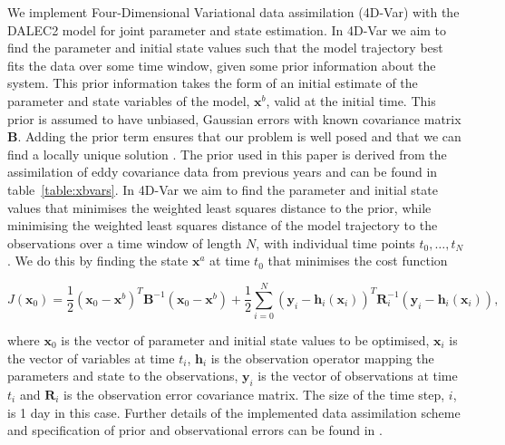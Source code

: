 \documentclass[draft,linenumbers]{agujournal}
\begin{document}
We implement Four-Dimensional Variational data assimilation (4D-Var) with the DALEC2 model for joint parameter and state estimation. In 4D-Var we aim to find the parameter and initial state values such that the model trajectory best fits the data over some time window, given some prior information about the system. This prior information takes the form of an initial estimate of the parameter and state variables of the model, $\textbf{x}^{b}$, valid at the initial time. This prior is assumed to have unbiased, Gaussian errors with known covariance matrix $\textbf{B}$. Adding the prior term ensures that our problem is well posed and that we can find a locally unique solution \citep{Tremolet2006}. The prior used in this paper is derived from the assimilation of eddy covariance data from previous years and can be found in table~\ref{table:xbvars}. In 4D-Var we aim to find the parameter and initial state values that minimises the weighted least squares distance to the prior, while minimising the weighted least squares distance of the model trajectory to the observations over a time window of length \(N\), with individual time points $t_{0}, \dots, t_{N}$ \citep{lawless2013}. We do this by finding the state $\textbf{x}^{a}$ at time $t_{0}$ that minimises the cost function

\begin{linenomath*}
\begin{equation}
J(\textbf{x}_0) = \frac{1}{2}(\textbf{x}_0-\textbf{x}^b)^{T}\textbf{B}^{-1}(\textbf{x}_0-\textbf{x}^b)+\frac{1}{2}\sum_{i=0}^{N}(\textbf{y}_i-\textbf{h}_i(\textbf{x}_i))^{T}\textbf{R}_{i}^{-1}(\textbf{y}_i-\textbf{h}_i(\textbf{x}_i)),
\end{equation}
\end{linenomath*}
where $\textbf{x}_{0}$ is the vector of parameter and initial state values to be optimised, $\textbf{x}_{i}$ is the vector of variables at time \(t_{i}\), $\textbf{h}_{i}$ is the observation operator mapping the parameters and state to the observations, $\textbf{y}_{i}$ is the vector of observations at time \(t_i\) and $\textbf{R}_{i}$ is the observation error covariance matrix. The size of the time step, \(i\), is 1 day in this case. Further details of the implemented data assimilation scheme and specification of prior and observational errors can be found in \citet{Pinnington2016299}. 
\end{document}
